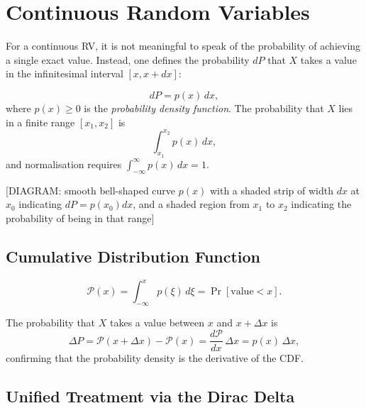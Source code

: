 \section{Continuous Random Variables}

For a continuous RV, it is not meaningful to speak of the probability of achieving a single exact value. Instead, one defines the probability $dP$ that $X$ takes a value in the infinitesimal interval $[x, x+dx]$:
\begin{definition}
\begin{equation}
    dP = p(x)\,dx,
\end{equation}
where $p(x) \ge 0$ is the \emph{probability density function}. The probability that $X$ lies in a finite range $[x_1, x_2]$ is
\begin{equation}
    \int_{x_1}^{x_2} p(x)\,dx,
\end{equation}
and normalisation requires $\int_{-\infty}^\infty p(x)\,dx = 1$.
\end{definition}

\begin{center}[DIAGRAM: smooth bell-shaped curve $p(x)$ with a shaded strip of width $dx$ at $x_0$ indicating $dP = p(x_0)dx$, and a shaded region from $x_1$ to $x_2$ indicating the probability of being in that range]\end{center}

\subsection{Cumulative Distribution Function}

\begin{definition}
\begin{equation}
    \mathcal{P}(x) = \int_{-\infty}^{x} p(\xi)\,d\xi = \Pr[\text{value} < x].
\end{equation}
\end{definition}
The probability that $X$ takes a value between $x$ and $x + \Delta x$ is
\begin{equation}
    \Delta P = \mathcal{P}(x + \Delta x) - \mathcal{P}(x) = \frac{d\mathcal{P}}{dx}\,\Delta x = p(x)\,\Delta x,
\end{equation}
confirming that the probability density is the derivative of the CDF.

\subsection{Unified Treatment via the Dirac Delta}

